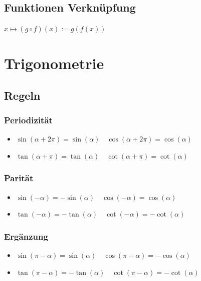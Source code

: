 \documentclass[8pt]{extarticle}
\begin{document}
\begin{multicols*}{3}
\subsection{Funktionen Verknüpfung}

$
x \mapsto (g \circ f)(x) := g(f(x))
$
%



\section{Trigonometrie}

\subsection{Regeln}
\subsubsection{Periodizität}
\begin{itemize}
 \item $\sin(\alpha + 2 \pi) = \sin(\alpha) \quad \cos(\alpha + 2 \pi) = \cos(\alpha)$
 \item $\tan(\alpha + \pi) = \tan(\alpha) \quad \cot(\alpha + \pi) = \cot(\alpha)$
\end{itemize}

\subsubsection{Parität}
\begin{itemize}
 \item $\sin(-\alpha) = - \sin(\alpha) \quad \cos(-\alpha) = \cos(\alpha)$
 \item $\tan(-\alpha) = - \tan(\alpha) \quad \cot(-\alpha) = - \cot(\alpha)$
\end{itemize}

\subsubsection{Ergänzung}
\begin{itemize}
 \item $\sin(\pi - \alpha) = \sin(\alpha) \quad \cos(\pi - \alpha) = - \cos(\alpha)$
 \item $\tan(\pi - \alpha) = -\tan(\alpha) \quad \cot(\pi - \alpha) = - \cot(\alpha)$
\end{itemize}



\end{multicols*}
\end{document}
